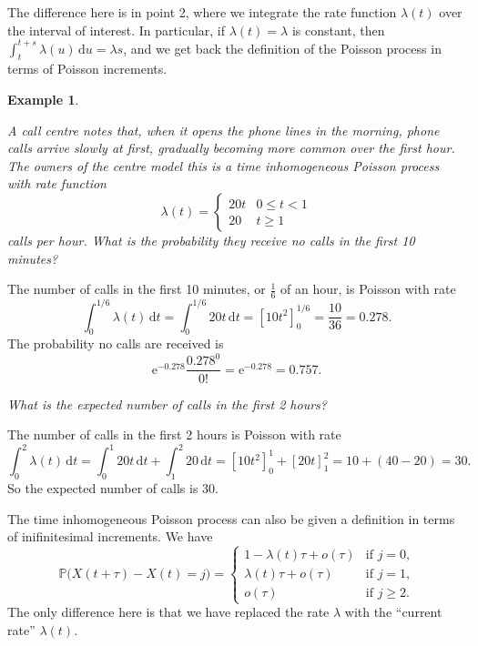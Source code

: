 \documentclass[
  a4paper,
]{article}
\theoremstyle{definition}
\theoremstyle{definition}
\newtheorem{example}{Example}[section]
\theoremstyle{definition}
\theoremstyle{remark}
\begin{document}
The difference here is in point 2, where we integrate the rate function \(\lambda(t)\) over the interval of interest. In particular, if \(\lambda(t) = \lambda\) is constant, then \(\int_t^{t+s} \lambda(u) \, \mathrm d u = \lambda s\), and we get back the definition of the Poisson process in terms of Poisson increments.

\begin{example}
\protect\hypertarget{exm:TIPP-call}{}\label{exm:TIPP-call}

\emph{A call centre notes that, when it opens the phone lines in the morning, phone calls arrive slowly at first, gradually becoming more common over the first hour. The owners of the centre model this is a time inhomogeneous Poisson process with rate function}
\[ \lambda(t) = \begin{cases} 20t & 0 \leq t < 1 \\
                              20  & t \geq 1 \end{cases} \]
\emph{calls per hour. What is the probability they receive no calls in the first 10 minutes?}

The number of calls in the first 10 minutes, or \(\frac16\) of an hour, is Poisson with rate
\[ \int_0^{1/6} \lambda(t) \, \mathrm dt = \int_0^{1/6}20t \, \mathrm dt = \left[10t^2\right]_0^{1/6} = \frac{10}{36} = 0.278 . \]
The probability no calls are received is
\[ \mathrm{e}^{-0.278} \frac{0.278^0}{0!} = \mathrm{e}^{-0.278} = 0.757 . \]

\emph{What is the expected number of calls in the first 2 hours?}

The number of calls in the first 2 hours is Poisson with rate
\[ \int_0^2 \lambda(t) \, \mathrm dt =  \int_0^1 20t \, \mathrm dt +  \int_1^2 20 \, \mathrm dt = \left[10t^2\right]_0^1 + \left[20t\right]_1^2 = 10 + (40 - 20) = 30 .        \]
So the expected number of calls is 30.

\end{example}

The time inhomogeneous Poisson process can also be given a definition in terms of inifinitesimal increments. We have
\begin{equation*} \mathbb P \big(X(t+\tau) - X(t) = j\big) = \begin{cases} 1 - \lambda(t) \tau + o(\tau) & \text{if $j = 0$,} \\
\lambda(t)\tau + o(\tau) & \text{if $j = 1$,} \\
o(\tau) & \text{if $j \geq 2$.} \end{cases}  \end{equation*}
The only difference here is that we have replaced the rate \(\lambda\) with the ``current rate'' \(\lambda(t)\).
\end{document}
